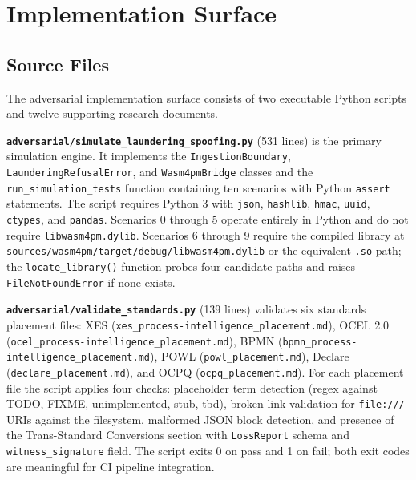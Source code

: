
\section{Implementation Surface}
\label{sec:adversarial-implementation}

\subsection{Source Files}
\label{sec:adversarial-implementation-sources}

The adversarial implementation surface consists of two executable Python scripts and twelve
supporting research documents.

\textbf{\texttt{adversarial/simulate\_laundering\_spoofing.py}} (531 lines) is the primary
simulation engine. It implements the \texttt{IngestionBoundary}, \texttt{LaunderingRefusalError},
and \texttt{Wasm4pmBridge} classes and the \texttt{run\_simulation\_tests} function containing
ten scenarios with Python \texttt{assert} statements. The script requires Python 3 with
\texttt{json}, \texttt{hashlib}, \texttt{hmac}, \texttt{uuid}, \texttt{ctypes}, and
\texttt{pandas}. Scenarios 0 through 5 operate entirely in Python and do not require
\texttt{libwasm4pm.dylib}. Scenarios 6 through 9 require the compiled library at
\texttt{sources/wasm4pm/target/debug/libwasm4pm.dylib} or the equivalent \texttt{.so} path;
the \texttt{locate\_library()} function probes four candidate paths and raises
\texttt{FileNotFoundError} if none exists.

\textbf{\texttt{adversarial/validate\_standards.py}} (139 lines) validates six standards
placement files: XES (\texttt{xes\_process-intelligence\_placement.md}), OCEL 2.0
(\texttt{ocel\_process-intelligence\_placement.md}), BPMN
(\texttt{bpmn\_process-intelligence\_placement.md}), POWL
(\texttt{powl\_placement.md}), Declare (\texttt{declare\_placement.md}), and OCPQ
(\texttt{ocpq\_placement.md}). For each placement file the script applies four checks:
placeholder term detection (regex against TODO, FIXME, unimplemented, stub, tbd),
broken-link validation for \texttt{file:///} URIs against the filesystem, malformed JSON
block detection, and presence of the Trans-Standard Conversions section with
\texttt{LossReport} schema and \texttt{witness\_signature} field. The script exits 0 on
pass and 1 on fail; both exit codes are meaningful for CI pipeline integration.

